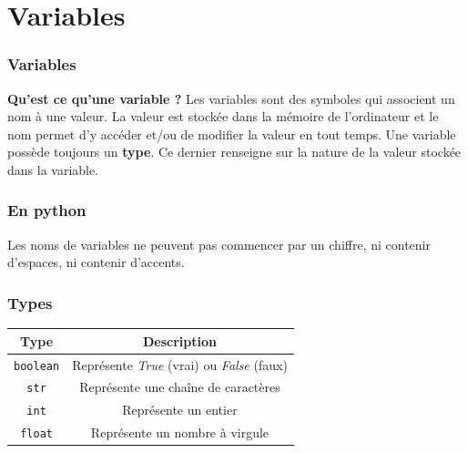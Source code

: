 \documentclass[handout]{beamer}
\begin{document}
\section{Variables}
\begin{frame}
\frametitle{Variables}
\textbf{Qu'est ce qu'une variable ?} Les variables sont des symboles qui associent un nom à une valeur. La valeur est stockée dans la mémoire de l'ordinateur et le nom permet d'y accéder et/ou de modifier la valeur en tout temps. Une variable possède toujours un \textbf{type}. Ce dernier renseigne sur la nature de la valeur stockée dans la variable.
\end{frame}
\begin{frame}
\frametitle{En python}
Les noms de variables ne peuvent pas commencer par un chiffre, ni contenir d'espaces, ni contenir d'accents.
\var
\end{frame}
\begin{frame}
\frametitle{Types}
\begin{table}[!h]
    \centering
    \begin{tabular}{|c|c|}
        \hline
        Type & Description \\
        \hline
        \texttt{boolean} & Représente \textit{True} (vrai) ou \textit{False} (faux) \\
        \hline
        \texttt{str} & Représente une chaîne de caractères \\
        \hline
        \texttt{int} & Représente un entier\\
        \hline
        \texttt{float} & Représente un nombre à virgule\\
        \hline
    \end{tabular}
    \label{table-primitifs}
\end{table}
\type
\end{frame}
\end{document}
